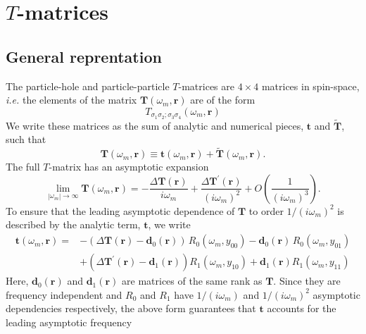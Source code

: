 \chapter{$T$-matrices}

\section{General reprentation}

The particle-hole and particle-particle $T$-matrices
are $4 \times 4$ matrices in spin-space, \textit{i.e.}
the elements of the matrix $\mathbf{T}(\omega_m,\mathbf{r})$ are of the form
\begin{equation}
T_{\sigma_1 \sigma_2; \sigma_3 \sigma_4}(\omega_m,\mathbf{r})
\end{equation}
We write these matrices as the sum of analytic and
numerical pieces, $\mathbf{t}$ and $\tilde{\mathbf{T}}$, such that
\begin{equation}
\mathbf{T}(\omega_m,\mathbf{r}) \equiv \mathbf{t}(\omega_m,\mathbf{r})
+ \tilde{\mathbf{T}}(\omega_m,\mathbf{r}).
\end{equation}
The full $T$-matrix has an asymptotic expansion
\begin{equation}
\lim_{|\omega_m| \to \infty}\mathbf{T}(\omega_m,\mathbf{r}) 
=
 - \frac{\Delta \mathbf{T}(\mathbf{r})}{i \omega_m} 
+ \frac{\Delta \mathbf{T}^{\prime}(\mathbf{r})}
{(i \omega_m)^2} + O \left(\frac{1}{(i\omega_m)^3}\right).
\end{equation}
To ensure that the leading asymptotic dependence of $\mathbf{T}$
to order $1/(i \omega_m)^2$ is described by 
the analytic term, $\mathbf{t}$, we write
\begin{equation}
\begin{split}
\label{t-mat-form}
\mathbf{t}(\omega_m,\mathbf{r}) = & -(\Delta \mathbf{T}(\mathbf{r})
- \mathbf{d}_0(\mathbf{r}))\,R_0(\omega_m, y_{00}) -
 \mathbf{d}_0(\mathbf{r}) \,R_0(\omega_m, y_{01}) \\
& + (\Delta \mathbf{T}^{\prime}(\mathbf{r}) - \mathbf{d}_1(\mathbf{r}))
R_1(\omega_m, y_{10}) + \mathbf{d}_1(\mathbf{r}) R_1(\omega_m, y_{11})
\end{split}
\end{equation}
Here, $\mathbf{d}_0(\mathbf{r})$ and 
$\mathbf{d}_1(\mathbf{r})$ are matrices of the
same rank as $\mathbf{T}$.  Since they are frequency independent
and $R_0$ and $R_1$ have $1/(i\omega_m)$ and $1/(i \omega_m)^2$
asymptotic dependencies respectively, 
the above form guarantees that
$\mathbf{t}$ accounts for the leading asymptotic frequency
